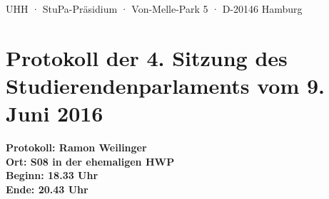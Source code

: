 \documentclass[ngerman,headheight=70pt]{scrartcl}
\begin{document}
    UHH · StuPa-Präsidium · Von-Melle-Park 5 · D-20146 Hamburg

    \section*{Protokoll der 4. Sitzung des Studierendenparlaments vom 9. Juni 2016}

    \textbf{Protokoll: Ramon Weilinger}\\
    \textbf{Ort: S08 in der ehemaligen HWP}\\
    \textbf{Beginn: 18.33 Uhr}\\
    \textbf{Ende: 20.43 Uhr}

    \vspace{0.5cm}
\end{document}

